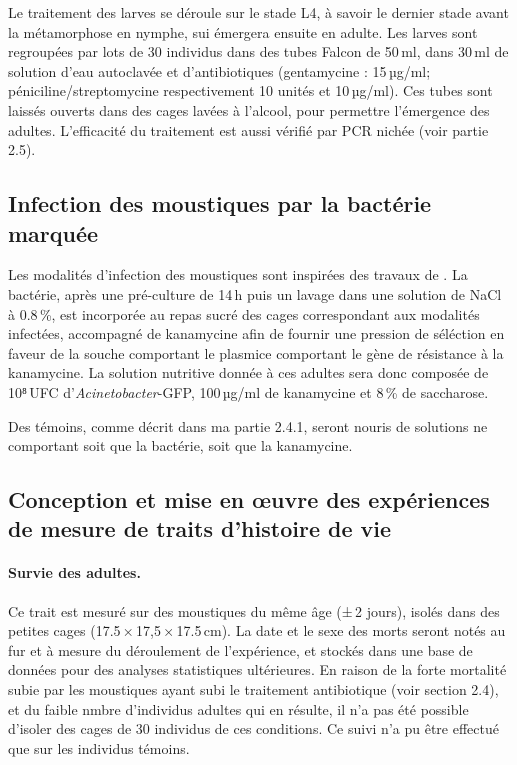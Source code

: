 Le traitement des larves se déroule sur le stade L4, à savoir le dernier stade avant la métamorphose en nymphe, sui émergera ensuite en adulte.
Les larves sont regroupées par lots de 30 individus dans des tubes Falcon de 50\,ml, dans 30\,ml de solution d'eau autoclavée et d'antibiotiques (gentamycine : 15\,µg/ml; péniciline/streptomycine respectivement 10 unités et 10\,µg/ml).
Ces tubes sont laissés ouverts dans des cages lavées à l'alcool, pour permettre l'émergence des adultes.
L'efficacité du traitement est aussi vérifié par PCR nichée (voir partie 2.5).


\subsection{Infection des moustiques par la bactérie marquée}

Les modalités d'infection des moustiques sont inspirées des travaux de \textcite{bahia2014}.
La bactérie, après une pré-culture de 14\,h puis un lavage dans une solution de NaCl à 0.8\,\%, est incorporée au repas sucré des cages correspondant aux modalités infectées, accompagné de kanamycine afin de fournir une pression de séléction en faveur de la souche comportant le plasmice comportant le gène de résistance à la kanamycine.
La solution nutritive donnée à ces adultes sera donc composée de 10⁸\,UFC d'\textit{Acinetobacter}-GFP, 100\,µg/ml de kanamycine et 8\,\% de saccharose.

Des témoins, comme décrit dans ma partie 2.4.1, seront nouris de solutions ne comportant soit que la bactérie, soit que la kanamycine.

\subsection{Conception et mise en \oe{}uvre des expériences de mesure de traits d'histoire de vie}


\paragraph{Survie des adultes.} Ce trait est mesuré sur des moustiques du même âge (±\,2 jours), isolés dans des petites cages (17.5\,×\,17,5\,×\,17.5\,cm). La date et le sexe des morts seront notés au fur et à mesure du déroulement de l'expérience, et stockés dans une base de données pour des analyses statistiques ultérieures.
En raison de la forte mortalité subie par les moustiques ayant subi le traitement antibiotique (voir section 2.4), et du faible nmbre d'individus adultes qui en résulte, il n'a pas été possible d'isoler des cages de 30 individus de ces conditions.
Ce suivi n'a pu être effectué que sur les individus témoins.


